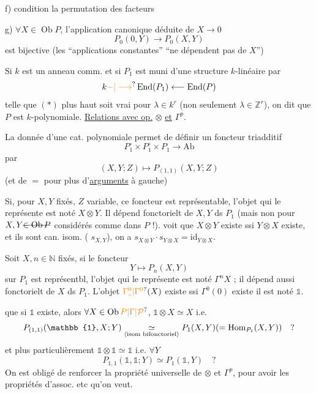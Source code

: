 f) condition   la permutation des facteurs

g) $\forall X\in\operatorname{Ob}P$, l'application canonique déduite de
$X\longrightarrow0$
\[
P_0(0,Y)\longrightarrow P_0(X,Y)
\]
est bijective (les ``applications constantes'' 
``ne dépendent pas de $X$'')

Si $k$ est un anneau comm. et si $P_1$ est muni
d'une structure $k$-linéaire par
\[
k\unsure{-|\longrightarrow}\operatorname{End}(P_1)\longleftarrow\operatorname{End}(P)
\]
telle que $(*)$ plus haut soit vrai pour
$\lambda\in k^r$ (non seulement $\lambda\in\mathbb Z^r$), on dit que
$P$ est $k$-polynomiale.
\uline{Relations avec op.} $\otimes$ \uline{et} $\Gamma^p$.

La donnée d'une cat. polynomiale  permet
de définir un foncteur triadditif
\[
P_1^\circ\times P_1^\circ\times P_1\longrightarrow\mathrm{Ab}
\]
par
\[
(X,Y;Z)\longmapsto P_{(1,1)}(X,Y;Z)
\]
(et de $=$ pour plus d'\uline{arguments} à gauche)

Si, pour $X,Y$ fixés, $Z$ variable, ce foncteur
est représentable, l'objet qui le représente est
noté $X\otimes Y$. Il dépend fonctorielt de
$X,Y$ ds $P_1$ (mais non pour $X,Y\deleted{\in\operatorname{Ob}P}$ considérés
comme dans $P$ !).  voit que $X\otimes Y$ existe
ssi $Y\otimes X$ existe, et ils sont can. isom. (
$s_{X,Y}$), on a $s_{X\otimes Y}\cdot s_{Y\otimes X}=\mathrm{id}_{Y\otimes X}$.

Soit $X,n\in\mathbb N$ fixés, si le foncteur
\[
Y\longmapsto P_n(X,Y)
\]
sur $P_1$ est représentbl, l'objet qui le représente
est noté $\Gamma^n X$ ; il  dépend aussi fonctorielt
de $X$ ds $P_1$. L'objet $\unsure{\Gamma_{\scriptscriptstyle\circ}^0|\Gamma^0}(X)$ existe ssi $\Gamma^0(0)$ existe
il est noté $\mathbb{1}$.

 que \deleted{\unsure{$\forall$}} si $\mathbb{1}$ existe, alors $\forall X\in\operatorname{Ob}\unsure{P|\Gamma|\mathcal P}$,
$\mathbb{1}\otimes X\simeq X$ i.e.
\[
P_{(1,1)}(\mathbb{1},X;Y)\underset{\inserted{\text{isom bifonctoriel}}}{\simeq}P_1(X,Y)(=\operatorname{Hom}_{P_1}(X,Y))\quad ?
\]
et plus particulièrement $\mathbb{1}\otimes\mathbb{1}\simeq\mathbb{1}$ i.e. $\forall Y$
\[
P_{1,1}(\mathbb{1},\mathbb{1};Y)\simeq P_1(\mathbb{1},Y)\quad ?
\]
On est obligé de renforcer la propriété universelle
de $\otimes$ et $\Gamma^p$, pour avoir les propriétés d'assoc. etc
qu'on veut.

